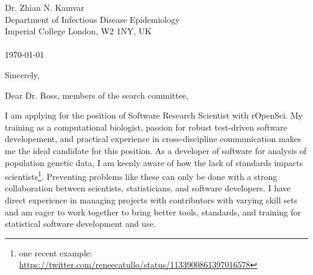 


\clearpage
\begin{flushright}
  Dr. Zhian N. Kamvar\\
  Department of Infectious Disease Epidemiology\\
  Imperial College London, W2 1NY, UK\\
  \phantom{menace}\\
  \today
\end{flushright}
\closing{Sincerely,} %

Dear Dr. Ross, members of the search committee,\\
\phantom{tollbooth}

I am applying for the position of Software Research Scientist with rOpenSci. My
training as a computational biologist, passion for robust test-driven software
developement, and practical experience in cross-discipline communication  makes
me the ideal candidate for this position. As a developer of software for
analysis of population genetic data, I am keenly aware of how the lack of
standards impacts scientists\footnote{one recent example:
\url{https://twitter.com/reneecatullo/status/1133900861397016578}}. Preventing
problems like these can only be done with a strong collaboration between
scientists, statisticians, and software developers. I have direct experience in
managing projects with contributors with varying skill sets and am eager to work
together to bring better tools, standards, and training for statistical software
development and use. 

